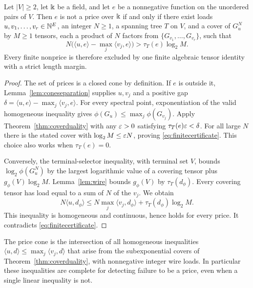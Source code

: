 \begin{theorem}
\label{thm:finitecertificate}
Let $|V|\ge2$, let $\Bbbk$ be a field, and let $e$ be a nonnegative
function on the unordered pairs of $V$. Then $e$ is not a price
over $\Bbbk$ if and only if there exist loads
$u,v_1,\ldots,v_r\in\mathbb N^E$, an integer $N\ge1$, a spanning tree
$T$ on $V$, and a cover of $G_u^N$ by $M\ge1$ tensors, each a
product of $N$ factors from $\{G_{v_1},\ldots,G_{v_r}\}$, such that
\begin{equation}\label{eq:finitecertificate}
 N\bigl(\langle u,e\rangle-\max_j\langle v_j,e\rangle\bigr)
   >\tau_T(e)\log_2 M .
\end{equation}
Every finite nonprice is therefore excluded by one finite
algebraic tensor identity with a strict length margin.
\end{theorem}

\begin{proof}
The set of prices is a closed cone by definition.
If $e$ is outside it, Lemma~\ref{lem:coneseparation} supplies
$u,v_j$ and a positive gap
$\delta=\langle u,e\rangle-\max_j\langle v_j,e\rangle$.
For every spectral point, exponentiation of the valid
homogeneous inequality gives
$\phi(G_u)\le\max_j\phi(G_{v_j})$.
Apply Theorem~\ref{thm:coverduality} with any
$\varepsilon>0$ satisfying $\tau_T(e)\varepsilon<\delta$.
For all large $N$ there is the stated cover with
$\log_2M\le\varepsilon N$, proving \eqref{eq:finitecertificate}.
This choice also works when $\tau_T(e)=0$.

Conversely, the terminal-selector inequality, with terminal set
$V$, bounds $\log_2\phi(G_u^N)$ by the largest logarithmic
value of a covering tensor plus $g_\phi(V)\log_2M$.
Lemma~\ref{lem:wire} bounds $g_\phi(V)$ by $\tau_T(d_\phi)$.
Every covering tensor has load equal to a sum of $N$ of the
$v_j$. We obtain
\[
 N\langle u,d_\phi\rangle
 \le N\max_j\langle v_j,d_\phi\rangle+
          \tau_T(d_\phi)\log_2M .
\]
This inequality is homogeneous and continuous, hence holds
for every price. It contradicts \eqref{eq:finitecertificate}.
\end{proof}

\begin{corollary}\label{cor:allpriceineq}
The price cone is the intersection of all homogeneous inequalities
$\langle u,d\rangle\le\max_j\langle v_j,d\rangle$
that arise from the subexponential covers of
Theorem~\ref{thm:coverduality}, with nonnegative integer wire loads.
In particular these inequalities are complete for detecting
failure to be a price, even when a single linear inequality is not.
\end{corollary}

